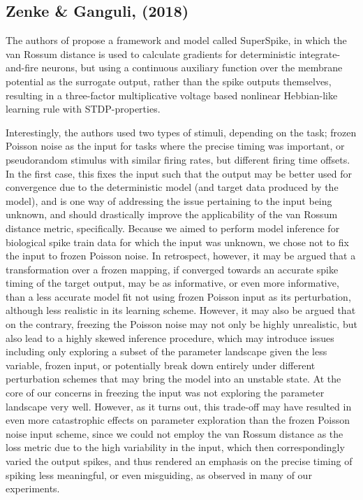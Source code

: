 \documentclass[mphil,deptreport,ianc]{infthesis} %
\begin{document}
\subsection{Zenke \& Ganguli, (2018)}

The authors of \cite{Zenke2018} propose a framework and model called SuperSpike, in which the van Rossum distance is used to calculate gradients for deterministic integrate-and-fire neurons, but using a continuous auxiliary function over the membrane potential as the surrogate output, rather than the spike outputs themselves, resulting in a three-factor multiplicative voltage based nonlinear Hebbian-like learning rule with STDP-properties.

Interestingly, the authors used two types of stimuli, depending on the task; frozen Poisson noise as the input for tasks where the precise timing was important, or pseudorandom stimulus with similar firing rates, but different firing time offsets.
In the first case, this fixes the input such that the output may be better used for convergence due to the deterministic model (and target data produced by the model), and is one way of addressing the issue pertaining to the input being unknown, and should drastically improve the applicability of the van Rossum distance metric, specifically.
Because we aimed to perform model inference for biological spike train data for which the input was unknown, we chose not to fix the input to frozen Poisson noise. 
In retrospect, however, it may be argued that a transformation over a frozen mapping, if converged towards an accurate spike timing of the target output, may be as informative, or even more informative, than a less accurate model fit not using frozen Poisson input as its perturbation, although less realistic in its learning scheme.
However, it may also be argued that on the contrary, freezing the Poisson noise may not only be highly unrealistic, but also lead to a highly skewed inference procedure, which may introduce issues including only exploring a subset of the parameter landscape given the less variable, frozen input, or potentially break down entirely under different perturbation schemes that may bring the model into an unstable state.
At the core of our concerns in freezing the input was not exploring the parameter landscape very well.
However, as it turns out, this trade-off may have resulted in even more catastrophic effects on parameter exploration than the frozen Poisson noise input scheme, since we could not employ the van Rossum distance as the loss metric due to the high variability in the input, which then correspondingly varied the output spikes, and thus rendered an emphasis on the precise timing of spiking less meaningful, or even misguiding, as observed in many of our experiments.
\end{document}
